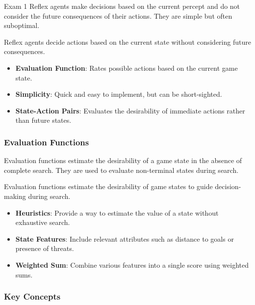 \begin{examnotes}{Exam 1}
    Reflex agents make decisions based on the current percept and do not consider the future consequences of their actions. They are simple but often suboptimal.
    
    \begin{highlight}
        Reflex agents decide actions based on the current state without considering future consequences.
        
        \begin{itemize}
            \item \textbf{Evaluation Function}: Rates possible actions based on the current game state.
            \item \textbf{Simplicity}: Quick and easy to implement, but can be short-sighted.
            \item \textbf{State-Action Pairs}: Evaluates the desirability of immediate actions rather than future states.
        \end{itemize}
    \end{highlight}
    
    \subsubsection*{Evaluation Functions}
    
    Evaluation functions estimate the desirability of a game state in the absence of complete search. They are used to evaluate non-terminal states during search.
    
    \begin{highlight}
        Evaluation functions estimate the desirability of game states to guide decision-making during search.
        
        \begin{itemize}
            \item \textbf{Heuristics}: Provide a way to estimate the value of a state without exhaustive search.
            \item \textbf{State Features}: Include relevant attributes such as distance to goals or presence of threats.
            \item \textbf{Weighted Sum}: Combine various features into a single score using weighted sums.
        \end{itemize}
    \end{highlight}
    
    \subsubsection*{Key Concepts}
    

\end{examnotes}
